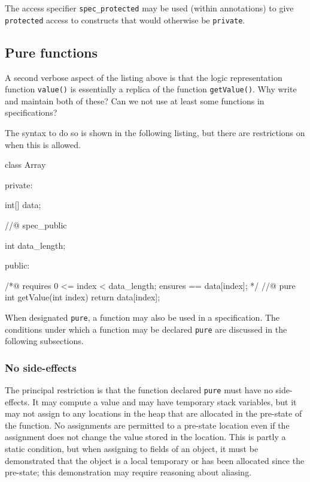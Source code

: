The access specifier \lstinline|spec_protected| may be used (within \NAME{} annotations) to give \lang{} \lstinline|protected| access to \lang{} constructs
that would otherwise be \lstinline|private|.

\subsection{Pure functions}
\label{sec:pure}
A second verbose aspect of the listing above is that the logic representation function \lstinline|value()| is essentially a replica of
the \lang{} function \lstinline|getValue()|. Why write and maintain both of these? Can we not use at least some \lang{} functions in 
specifications?

The syntax to do so is shown in the following listing, but there are restrictions on when this is allowed.

\begin{listing-nonumber}
class Array {
	
  private:
	
    int[] data;
	
  //@ spec_public
	
    int data_length;
	
  public:
	
    /*@ 
      requires 0 <= index < data_length;
      ensures \result == data[index];
    */
    //@ pure
    int getValue(int index) {
		return data[index];
    }	
}
\end{listing-nonumber}

When designated \lstinline|pure|, a \lang{} function may also be used in a \NAME{} specification. The conditions under which a 
\lang{} function may be declared \lstinline|pure| are discussed in the following subsections.

\subsubsection{No side-effects}
The principal restriction is that the function declared \lstinline|pure| must have no side-effects. It may compute a value and may have 
temporary stack variables, but it may not assign to any locations in the heap that are allocated in the pre-state of the function.
No assignments are permitted to a pre-state location even if the assignment does not change the value stored in the location.
This is partly a static condition, but when assigning to fields of an object, it must be demonstrated that the object is a local temporary or
has been allocated since the pre-state; this demonstration may require reasoning about aliasing.

